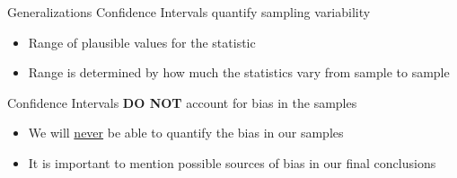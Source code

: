 \documentclass{beamer}
\begin{document}
\begin{frame}{Generalizations}
Confidence Intervals quantify sampling variability
\begin{itemize}
    \item Range of plausible values for the statistic
    \item Range is determined by how much the statistics vary from sample to sample
\end{itemize} \vspace{8mm}

Confidence Intervals \textbf{DO NOT} account for bias in the samples
\begin{itemize}
    \item We will \underline{never} be able to quantify the bias in our samples
    \item It is important to mention possible sources of bias in our final conclusions
\end{itemize}
\end{frame}


%
%
\end{document}
